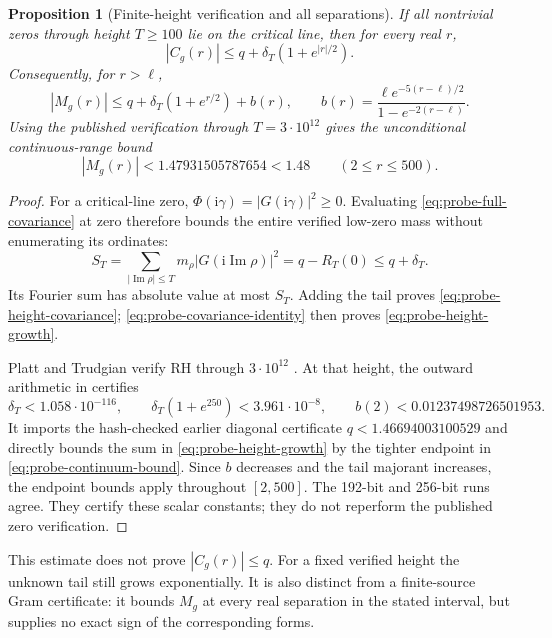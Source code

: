 \documentclass[11pt]{article}
\numberwithin{equation}{section}
\newtheorem{proposition}[theorem]{Proposition}
\theoremstyle{definition}
\theoremstyle{remark}
\newcommand{\Ima}{\operatorname{Im}}
\newcommand{\ii}{\mathrm i}
\begin{document}
\begin{proposition}[Finite-height verification and all separations]
\label{prop:probe-verified-height}
If all nontrivial zeros through height \(T\ge100\) lie on the critical
line, then for every real \(r\),
\begin{equation}\label{eq:probe-height-covariance}
|C_g(r)|\le q+\delta_T(1+e^{|r|/2}).
\end{equation}
Consequently, for \(r>\ell\),
\begin{equation}\label{eq:probe-height-growth}
|M_g(r)|\le q+\delta_T(1+e^{r/2})+b(r),\qquad
b(r)=\frac{\ell e^{-5(r-\ell)/2}}{1-e^{-2(r-\ell)}}.
\end{equation}
Using the published verification through \(T=3\cdot10^{12}\) gives
the unconditional continuous-range bound
\begin{equation}\label{eq:probe-continuum-bound}
|M_g(r)|<1.47931505787654<1.48\qquad(2\le r\le500).
\end{equation}
\end{proposition}
\begin{proof}
For a critical-line zero, \(\Phi(\ii\gamma)=|G(\ii\gamma)|^2\ge0\).
Evaluating \eqref{eq:probe-full-covariance} at zero therefore bounds the
entire verified low-zero mass without enumerating its ordinates:
\[
S_T=\sum_{|\Ima\rho|\le T}m_\rho|G(\ii\Ima\rho)|^2
=q-R_T(0)\le q+\delta_T.
\]
Its Fourier sum has absolute value at most \(S_T\). Adding the tail
proves \eqref{eq:probe-height-covariance};
\eqref{eq:probe-covariance-identity} then proves
\eqref{eq:probe-height-growth}.

Platt and Trudgian verify RH through \(3\cdot10^{12}\)
\cite{PlattTrudgian}. At that height, the outward arithmetic in
\cite{GlobalGrowthCertificate} certifies
\[
\delta_T<1.058\cdot10^{-116},\qquad
\delta_T(1+e^{250})<3.961\cdot10^{-8},\qquad
b(2)<0.01237498726501953.
\]
It imports the hash-checked earlier diagonal certificate
\(q<1.46694003100529\) and directly bounds the sum in
\eqref{eq:probe-height-growth} by the tighter endpoint in
\eqref{eq:probe-continuum-bound}. Since \(b\) decreases and the tail
majorant increases, the endpoint bounds apply throughout \([2,500]\).
The 192-bit and 256-bit runs agree. They certify these scalar constants;
they do not reperform the published zero verification.
\end{proof}

This estimate does not prove \(|C_g(r)|\le q\). For a fixed verified
height the unknown tail still grows exponentially. It is also distinct
from a finite-source Gram certificate: it bounds \(M_g\) at every real
separation in the stated interval, but supplies no exact sign of the
corresponding forms.
\end{document}
